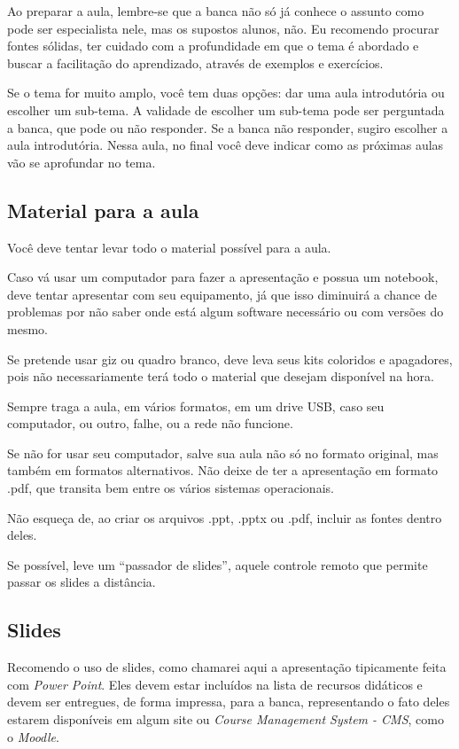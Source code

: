 \documentclass{article}
\begin{document}
Ao preparar a aula, lembre-se que a banca não só já conhece o assunto como pode ser especialista nele, mas os supostos alunos, não. Eu recomendo procurar fontes sólidas, ter cuidado com a profundidade em que o tema é abordado e buscar a facilitação do aprendizado, através de exemplos e exercícios. 

Se o tema for muito amplo, você tem duas opções: dar uma aula introdutória ou escolher um sub-tema. A validade de escolher um sub-tema pode ser perguntada a banca, que pode ou não responder. Se a banca não responder, sugiro escolher a aula introdutória. Nessa aula, no final você deve indicar como as próximas aulas vão se aprofundar no tema.

\subsection{Material para a aula}

Você deve tentar levar todo o material possível para a aula.

Caso vá usar um computador para fazer a apresentação e possua um notebook, deve tentar apresentar com seu equipamento, já que isso diminuirá a chance de problemas por não saber onde está algum software necessário ou com versões do mesmo.

Se pretende usar giz ou quadro branco, deve leva seus kits coloridos e apagadores, pois não necessariamente terá todo o material que desejam disponível na hora.

Sempre traga a aula, em vários formatos, em um drive USB, caso seu computador, ou outro, falhe, ou a rede não funcione.

Se não for usar seu computador, salve sua aula não só no formato original, mas também em formatos alternativos. Não deixe de ter a apresentação em formato .pdf, que transita bem entre os vários sistemas operacionais.

Não esqueça de, ao criar os arquivos .ppt, .pptx ou .pdf, incluir as fontes dentro deles.

Se possível, leve um ``passador de slides'', aquele controle remoto que permite passar os slides a distância.

\subsection{Slides}

Recomendo o uso de slides, como chamarei aqui a apresentação tipicamente feita com \textit{Power Point}. Eles devem estar incluídos na lista de recursos didáticos e devem ser entregues, de forma impressa, para a banca, representando o fato deles estarem disponíveis em algum site ou \textit{Course Management System - CMS}, como o \textit{Moodle}.
\end{document}

